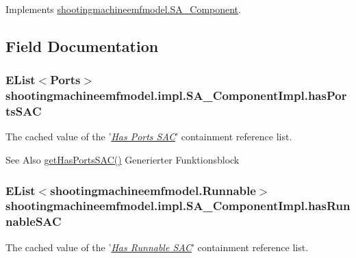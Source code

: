 Implements \hyperlink{interfaceshootingmachineemfmodel_1_1_s_a___component_a807c969a00a6ed3837fbfe8213c3bb24}{shootingmachineemfmodel.\-S\-A\-\_\-\-Component}.



\subsection{Field Documentation}
\hypertarget{classshootingmachineemfmodel_1_1impl_1_1_s_a___component_impl_a359f485fb955ec6fe15f6ac9986ba568}{
\subsubsection[{has\-Ports\-S\-A\-C}]{\setlength{\rightskip}{0pt plus 5cm}E\-List$<${\bf Ports}$>$ shootingmachineemfmodel.\-impl.\-S\-A\-\_\-\-Component\-Impl.\-has\-Ports\-S\-A\-C\hspace{0.3cm}{\ttfamily [protected]}}}\label{classshootingmachineemfmodel_1_1impl_1_1_s_a___component_impl_a359f485fb955ec6fe15f6ac9986ba568}
The cached value of the '\hyperlink{classshootingmachineemfmodel_1_1impl_1_1_s_a___component_impl_a33cf8cec28514b7843445dc395c5b072}{{\itshape Has Ports S\-A\-C}}' containment reference list.

\begin{DoxySeeAlso}{See Also}
\hyperlink{classshootingmachineemfmodel_1_1impl_1_1_s_a___component_impl_a33cf8cec28514b7843445dc395c5b072}{get\-Has\-Ports\-S\-A\-C()} Generierter Funktionsblock  
\end{DoxySeeAlso}
\hypertarget{classshootingmachineemfmodel_1_1impl_1_1_s_a___component_impl_a22a494ca31428e1931f826c0cb14ecb9}{
\subsubsection[{has\-Runnable\-S\-A\-C}]{\setlength{\rightskip}{0pt plus 5cm}E\-List$<${\bf shootingmachineemfmodel.\-Runnable}$>$ shootingmachineemfmodel.\-impl.\-S\-A\-\_\-\-Component\-Impl.\-has\-Runnable\-S\-A\-C\hspace{0.3cm}{\ttfamily [protected]}}}\label{classshootingmachineemfmodel_1_1impl_1_1_s_a___component_impl_a22a494ca31428e1931f826c0cb14ecb9}
The cached value of the '\hyperlink{classshootingmachineemfmodel_1_1impl_1_1_s_a___component_impl_a4e201e8a6ffc5a7434539c6b2d36e1e4}{{\itshape Has Runnable S\-A\-C}}' containment reference list.

